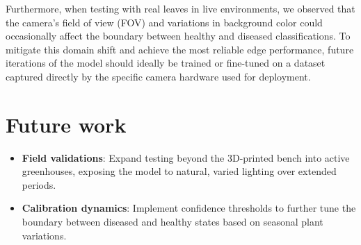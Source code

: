 \documentclass[a4paper,onesided,12pt]{report}
\begin{document}
Furthermore, when testing with real leaves in live environments, we observed that the camera's field of view (FOV) and variations in background color could occasionally affect the boundary between healthy and diseased classifications. To mitigate this domain shift and achieve the most reliable edge performance, future iterations of the model should ideally be trained or fine-tuned on a dataset captured directly by the specific camera hardware used for deployment.

\section{Future work}

\begin{itemize}
\item \textbf{Field validations}: Expand testing beyond the 3D-printed bench into active greenhouses, exposing the model to natural, varied lighting over extended periods.
\item \textbf{Calibration dynamics}: Implement confidence thresholds to further tune the boundary between diseased and healthy states based on seasonal plant variations.
\end{itemize}



\end{document}
